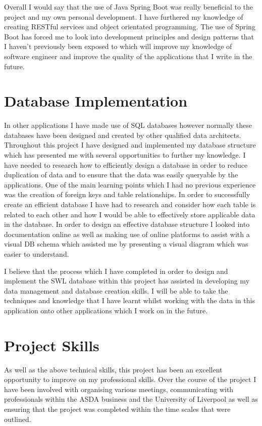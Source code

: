 \documentclass[a4paper,11pt]{report}
\begin{document}
Overall I would say that the use of Java Spring Boot was really beneficial to the project and my own personal development. I have furthered 
my knowledge of creating RESTful services and object orientated programming. The use of Spring Boot has forced me to look into development 
principles and design patterns that I haven't previously been exposed to which will improve my knowledge of software engineer and improve 
the quality of the applications that I write in the future.


\section{Database Implementation}
In other applications I have made use of SQL databases however normally these databases have been designed and created by other qualified data architects.
Throughout this project I have designed and implemented my database structure which has presented me with several opportunities to further my knowledge.
I have needed to research how to efficiently design a database in order to reduce duplication of data and to ensure that the data was easily queryable by the applications. 
One of the main learning points which I had no previous experience was the creation of foreign keys and table relationships.
In order to successfully create an efficient database I have had to research and consider how each table is related to each other 
and how I would be able to effectively store applicable data in the database.
In order to design an effective database structure I looked into documentation online as well as making use of online platforms
to assist with a visual DB schema which assisted me by presenting a visual diagram which was easier to understand.

I believe that the process which I have completed in order to design and implement the SWL database within this project
has assisted in developing my data management and database creation skills. 
I will be able to take the techniques and knowledge that I have learnt whilst working with the data in this application
onto other applications which I work on in the future. 


\section{Project Skills}
As well as the above technical skills, this project has been an excellent opportunity to improve on my professional skills.
Over the course of the project I have been involved with organising various meetings, communicating with professionals within the ASDA business and the University of Liverpool as well as ensuring that the project was completed within the time scales that were outlined.
\end{document}
